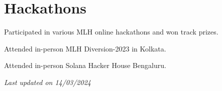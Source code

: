 \documentclass[a4paper,11pt]{article}
\begin{document}
\section{Hackathons}
\begin{description}[font=$\bullet$]
\item {\normalsize Participated in various MLH online hackathons and won track prizes.}
\vspace{-5pt}
\item {\normalsize Attended in-person MLH Diversion-2023 in Kolkata.}
\vspace{-5pt}
\item {\normalsize Attended in-person Solana Hacker House Bengaluru.}
\vspace{-5pt}
\end{description}
\vspace{-5pt}
{\hfill \textit{Last updated on 14/03/2024}}
\end{document}
